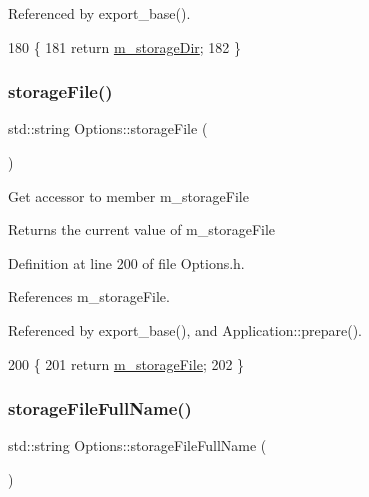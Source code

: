 Referenced by export\+\_\+base().


\begin{DoxyCode}
180                                \{
181                 \textcolor{keywordflow}{return} \hyperlink{classOptions_a88d9ed92fceb1c91e4df59bc1f81ab3b}{m\_storageDir};
182         \}
\end{DoxyCode}
\mbox{\label{classOptions_a6661fe4edd501f7e97527b8f9354ef84}} 
\subsubsection{\texorpdfstring{storage\+File()}{storageFile()}}
{\footnotesize\ttfamily std\+::string Options\+::storage\+File (\begin{DoxyParamCaption}{ }\end{DoxyParamCaption})\hspace{0.3cm}{\ttfamily [inline]}}

Get accessor to member m\+\_\+storage\+File \begin{DoxyReturn}{Returns}
the current value of m\+\_\+storage\+File 
\end{DoxyReturn}


Definition at line 200 of file Options.\+h.



References m\+\_\+storage\+File.



Referenced by export\+\_\+base(), and Application\+::prepare().


\begin{DoxyCode}
200                                 \{
201                 \textcolor{keywordflow}{return} \hyperlink{classOptions_a4d952db4e93d3aae6db86d89faa3677a}{m\_storageFile};
202         \}
\end{DoxyCode}
\mbox{\label{classOptions_a68c501133588cd4b1c80219adb926e8d}} 
\subsubsection{\texorpdfstring{storage\+File\+Full\+Name()}{storageFileFullName()}}
{\footnotesize\ttfamily std\+::string Options\+::storage\+File\+Full\+Name (\begin{DoxyParamCaption}{ }\end{DoxyParamCaption})\hspace{0.3cm}{\ttfamily [inline]}}

